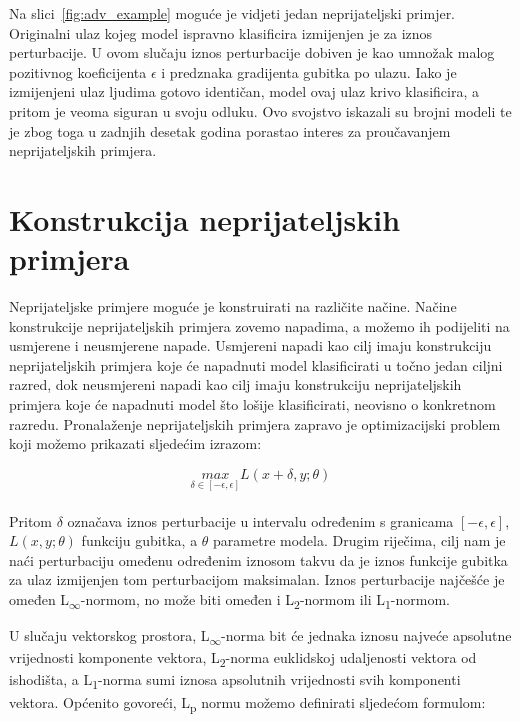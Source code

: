 \documentclass[times, utf8, zavrsni, numeric]{fer}
\begin{document}
Na slici~\ref{fig:adv_example} moguće je vidjeti jedan neprijateljski primjer.
Originalni ulaz kojeg model ispravno klasificira izmijenjen je za iznos perturbacije.
U ovom slučaju iznos perturbacije dobiven je kao umnožak malog pozitivnog koeficijenta $\epsilon$ i predznaka gradijenta gubitka po ulazu.
Iako je izmijenjeni ulaz ljudima gotovo identičan, model ovaj ulaz krivo klasificira, a pritom je veoma siguran u svoju odluku.
Ovo svojstvo iskazali su brojni modeli te je zbog toga u zadnjih desetak godina porastao interes za proučavanjem neprijateljskih primjera.

\section{Konstrukcija neprijateljskih primjera}

Neprijateljske primjere moguće je konstruirati na različite načine. 
Načine konstrukcije neprijateljskih primjera zovemo napadima, a možemo ih podijeliti na usmjerene i neusmjerene napade.
Usmjereni napadi kao cilj imaju konstrukciju neprijateljskih primjera koje će napadnuti model klasificirati u točno jedan ciljni razred,
dok neusmjereni napadi kao cilj imaju konstrukciju neprijateljskih primjera koje će napadnuti model što lošije klasificirati, neovisno o konkretnom razredu.
Pronalaženje neprijateljskih primjera zapravo je optimizacijski problem koji možemo prikazati sljedećim izrazom:

\begin{equation}
    \underset{\delta \in [-\epsilon, \epsilon]}{max}L(x + \delta,y;\theta)
    \label{eq:adversarial_optimization}
\end{equation}
\\
Pritom $\delta$ označava iznos perturbacije u intervalu određenim s granicama $[-\epsilon, \epsilon]$, $L(x,y;\theta)$ funkciju gubitka, a $\theta$ parametre modela.
Drugim riječima, cilj nam je naći perturbaciju omeđenu određenim iznosom takvu da je iznos funkcije gubitka za ulaz izmijenjen tom perturbacijom maksimalan.
Iznos perturbacije najčešće je omeđen L\textsubscript{$\infty$}-normom, no može biti omeđen i L\textsubscript{2}-normom ili L\textsubscript{1}-normom. 

U slučaju vektorskog prostora, L\textsubscript{$\infty$}-norma bit će jednaka iznosu najveće apsolutne vrijednosti komponente vektora, L\textsubscript{2}-norma euklidskoj udaljenosti vektora od ishodišta, a L\textsubscript{1}-norma sumi iznosa apsolutnih vrijednosti svih komponenti vektora.
Općenito govoreći, L\textsubscript{p} normu možemo definirati sljedećom formulom:
\end{document}
